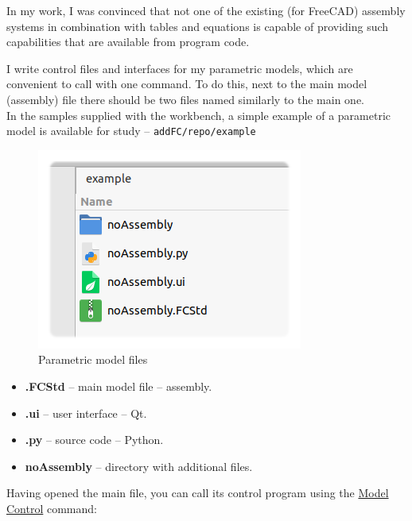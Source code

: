 \documentclass[a4paper,12pt]{article}
\begin{document}
In my work, I was convinced that not one of the existing (for FreeCAD) assembly systems in combination with tables and equations is capable of providing such capabilities that are available from program code.

I write control files and interfaces for my parametric models, which are convenient to call with one command. To do this, next to the main model (assembly) file there should be two files named similarly to the main one.\\

In the samples supplied with the workbench, a simple example of a parametric model is available for study -- \verb|addFC/repo/example|

\begin{figure}[htp]
	\centering
	\includegraphics[scale=1]{img/example.png}
	\caption{Parametric model files}
	\label{sec:example}
\end{figure}

\begin{itemize}
	\item \textbf{.FCStd} -- main model file -- assembly.
	\item \textbf{.ui} -- user interface -- Qt.
	\item \textbf{.py} -- source code -- Python.
	\item \textbf{noAssembly} -- directory with additional files.
\end{itemize}

\pagebreak

Having opened the main file, you can call its control program using the \hyperref[sec:3]{Model Control} command:
\end{document}
